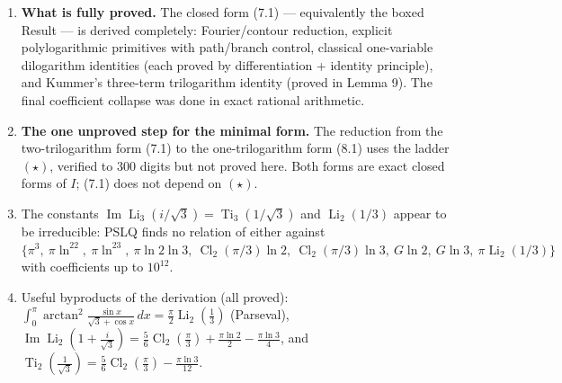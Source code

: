 \documentclass[11pt]{article}
\theoremstyle{remark}
\begin{document}
\begin{enumerate}
\item \textbf{What is fully proved.} The closed form (7.1) --- equivalently the boxed Result --- is derived completely: Fourier/contour reduction, explicit polylogarithmic primitives with path/branch control, classical one-variable dilogarithm identities (each proved by differentiation + identity principle), and Kummer's three-term trilogarithm identity (proved in Lemma 9). The final coefficient collapse was done in exact rational arithmetic.
\item \textbf{The one unproved step for the minimal form.} The reduction from the two-trilogarithm form (7.1) to the one-trilogarithm form (8.1) uses the ladder $(\star)$, verified to 300 digits but not proved here. Both forms are exact closed forms of $I$; (7.1) does not depend on $(\star)$.
\item The constants $\operatorname{Im}\operatorname{Li}_3(i/\sqrt3)=\operatorname{Ti}_3(1/\sqrt3)$ and $\operatorname{Li}_2(1/3)$ appear to be irreducible: PSLQ finds no relation of either against $\{\pi^3,\ \allowbreak\pi\ln^22,\ \allowbreak\pi\ln^23,\ \allowbreak\pi\ln2\ln3,\ \allowbreak\operatorname{Cl}_2(\pi/3)\ln2,\ \allowbreak\operatorname{Cl}_2(\pi/3)\ln3,\ \allowbreak G\ln2,\ \allowbreak G\ln3,\ \allowbreak\pi\operatorname{Li}_2(1/3)\}$ with coefficients up to $10^{12}$.
\item Useful byproducts of the derivation (all proved): $\int_0^\pi\arctan^2\frac{\sin x}{\sqrt3+\cos x}\,dx=\frac\pi2\operatorname{Li}_2(\frac13)$ (Parseval), $\operatorname{Im}\operatorname{Li}_2(1+\tfrac{i}{\sqrt3})=\tfrac56\operatorname{Cl}_2(\tfrac\pi3)+\tfrac{\pi\ln2}2-\tfrac{\pi\ln3}4$, and $\operatorname{Ti}_2(\tfrac1{\sqrt3})=\tfrac56\operatorname{Cl}_2(\tfrac\pi3)-\tfrac{\pi\ln3}{12}$.
\end{enumerate}
\end{document}
